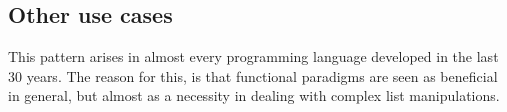 \subsection{Other use cases}

This pattern arises in almost every programming language developed in the last 30 years.  The reason for this, is that functional paradigms are seen as beneficial in general, but almost as a necessity in dealing with complex list manipulations.    